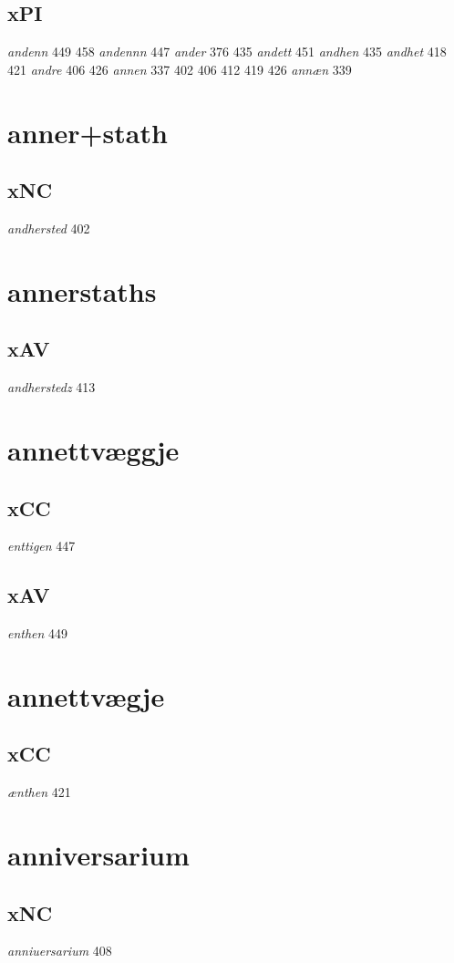 \documentclass[a4paper,twocolumn]{article}
\begin{document}
\subsection{xPI}
\label{sec:org1db3229}
\emph{andenn} 449 458 \emph{andennn} 447 \emph{ander} 376 435 \emph{andett} 451 \emph{andhen} 435 \emph{andhet} 418 421 \emph{andre} 406 426 \emph{annen} 337 402 406 412 419 426 \emph{annæn} 339 
\section{anner+stath}
\label{sec:orgd00392c}
\subsection{xNC}
\label{sec:org9109d80}
\emph{andhersted} 402 
\section{annerstaths}
\label{sec:orgb7f8ac5}
\subsection{xAV}
\label{sec:orgc435f59}
\emph{andherstedz} 413 
\section{annettvæggje}
\label{sec:org89c7130}
\subsection{xCC}
\label{sec:org670b754}
\emph{enttigen} 447 
\subsection{xAV}
\label{sec:orgfa06ff4}
\emph{enthen} 449 
\section{annettvægje}
\label{sec:org7f1080f}
\subsection{xCC}
\label{sec:orgfa54cc4}
\emph{ænthen} 421 
\section{anniversarium}
\label{sec:org863396f}
\subsection{xNC}
\label{sec:org599cd4e}
\emph{anniuersarium} 408 
\end{document}
